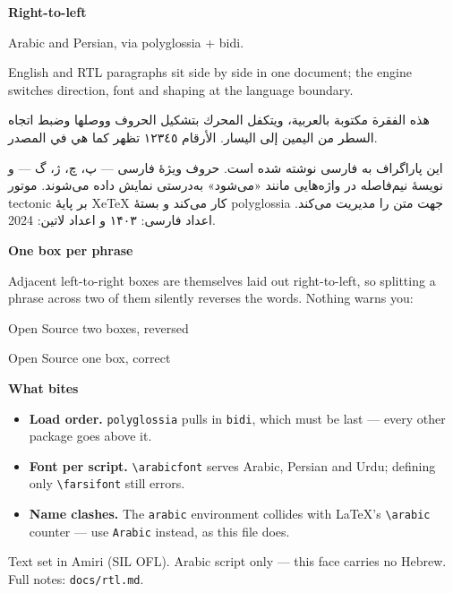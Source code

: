\documentclass[12pt,a4paper]{article}
\newcommand{\ltr}[1]{\textenglish{#1}}
\begin{document}
{\sffamily\bfseries\Huge Right-to-left}\par
\vspace{2pt}
{\sffamily\color{accent}\large Arabic and Persian, via polyglossia + bidi.}\par
\vspace{1em}

English and RTL paragraphs sit side by side in one document; the engine switches
direction, font and shaping at the language boundary.

\begin{Arabic}
هذه الفقرة مكتوبة بالعربية، ويتكفل المحرك بتشكيل الحروف ووصلها وضبط اتجاه
السطر من اليمين إلى اليسار. الأرقام ١٢٣٤٥ تظهر كما هي في المصدر.
\end{Arabic}

\begin{farsi}
این پاراگراف به فارسی نوشته شده است. حروف ویژهٔ فارسی — پ، چ، ژ، گ — و
نویسهٔ نیم‌فاصله در واژه‌هایی مانند «می‌شود» به‌درستی نمایش داده می‌شوند.
موتور \ltr{tectonic} بر پایهٔ \ltr{XeTeX} کار می‌کند و بستهٔ \ltr{polyglossia}
جهت متن را مدیریت می‌کند. اعداد فارسی: ۱۴۰۳ و اعداد لاتین: 2024.
\end{farsi}

\vspace{0.6em}
{\sffamily\bfseries\large One box per phrase}\par
\vspace{0.2em}
Adjacent left-to-right boxes are themselves laid out right-to-left, so splitting
a phrase across two of them silently reverses the words. Nothing warns you:

\begin{farsi}
\ltr{Open} \ltr{Source}  \quad \ltr{two boxes, reversed}
\end{farsi}

\begin{farsi}
\ltr{Open Source}  \quad \ltr{one box, correct}
\end{farsi}

\vspace{0.9em}
{\sffamily\bfseries\large What bites}\par
\vspace{0.2em}
\begin{itemize}\setlength\itemsep{2pt}
  \item \textbf{Load order.} \texttt{polyglossia} pulls in \texttt{bidi}, which
        must be last — every other package goes above it.
  \item \textbf{Font per script.} \verb|\arabicfont| serves Arabic, Persian and
        Urdu; defining only \verb|\farsifont| still errors.
  \item \textbf{Name clashes.} The \verb|arabic| environment collides with
        LaTeX's \verb|\arabic| counter — use \verb|Arabic| instead, as this
        file does.
\end{itemize}

\vspace{0.4em}
{\color{muted}\small Text set in Amiri (SIL OFL). Arabic script only — this face
carries no Hebrew. Full notes: \texttt{docs/rtl.md}.}
\end{document}
